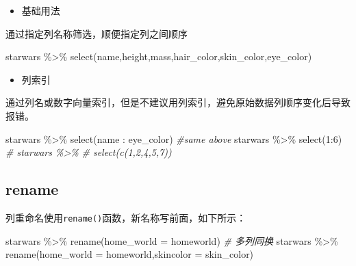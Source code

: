 \documentclass[
]{book}
\newenvironment{Shaded}{\begin{snugshade}}{\end{snugshade}}
\newcommand{\AttributeTok}[1]{\textcolor[rgb]{0.77,0.63,0.00}{#1}}
\newcommand{\CommentTok}[1]{\textcolor[rgb]{0.56,0.35,0.01}{\textit{#1}}}
\newcommand{\DecValTok}[1]{\textcolor[rgb]{0.00,0.00,0.81}{#1}}
\newcommand{\FunctionTok}[1]{\textcolor[rgb]{0.00,0.00,0.00}{#1}}
\newcommand{\NormalTok}[1]{#1}
\newcommand{\SpecialCharTok}[1]{\textcolor[rgb]{0.00,0.00,0.00}{#1}}
\providecommand{\tightlist}{%
  \setlength{\itemsep}{0pt}\setlength{\parskip}{0pt}}
\begin{document}
\begin{itemize}
\tightlist
\item
  基础用法
\end{itemize}

通过指定列名称筛选，顺便指定列之间顺序

\begin{Shaded}
\begin{Highlighting}[]
\NormalTok{starwars }\SpecialCharTok{\%\textgreater{}\%} 
  \FunctionTok{select}\NormalTok{(name,height,mass,hair\_color,skin\_color,eye\_color)}
\end{Highlighting}
\end{Shaded}

\begin{itemize}
\tightlist
\item
  列索引
\end{itemize}

通过列名或数字向量索引，但是不建议用列索引，避免原始数据列顺序变化后导致报错。

\begin{Shaded}
\begin{Highlighting}[]
\NormalTok{starwars }\SpecialCharTok{\%\textgreater{}\%} 
  \FunctionTok{select}\NormalTok{(name }\SpecialCharTok{:}\NormalTok{ eye\_color)}
\CommentTok{\#same above}
\NormalTok{starwars }\SpecialCharTok{\%\textgreater{}\%} 
  \FunctionTok{select}\NormalTok{(}\DecValTok{1}\SpecialCharTok{:}\DecValTok{6}\NormalTok{)}
\CommentTok{\# starwars \%\textgreater{}\% }
\CommentTok{\#   select(c(1,2,4,5,7))}
\end{Highlighting}
\end{Shaded}

\hypertarget{rename}{%
\subsection{rename}\label{rename}}

列重命名使用\texttt{rename()}函数，新名称写前面，如下所示：

\begin{Shaded}
\begin{Highlighting}[]
\NormalTok{starwars }\SpecialCharTok{\%\textgreater{}\%} \FunctionTok{rename}\NormalTok{(}\AttributeTok{home\_world =}\NormalTok{ homeworld)}
\CommentTok{\# 多列同换}
\NormalTok{starwars }\SpecialCharTok{\%\textgreater{}\%} \FunctionTok{rename}\NormalTok{(}\AttributeTok{home\_world =}\NormalTok{ homeworld,}\AttributeTok{skincolor =}\NormalTok{ skin\_color)}
\end{Highlighting}
\end{Shaded}
\end{document}
